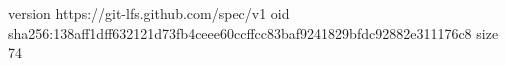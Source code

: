 version https://git-lfs.github.com/spec/v1
oid sha256:138aff1dff632121d73fb4ceee60ccffcc83baf9241829bfdc92882e311176c8
size 74
